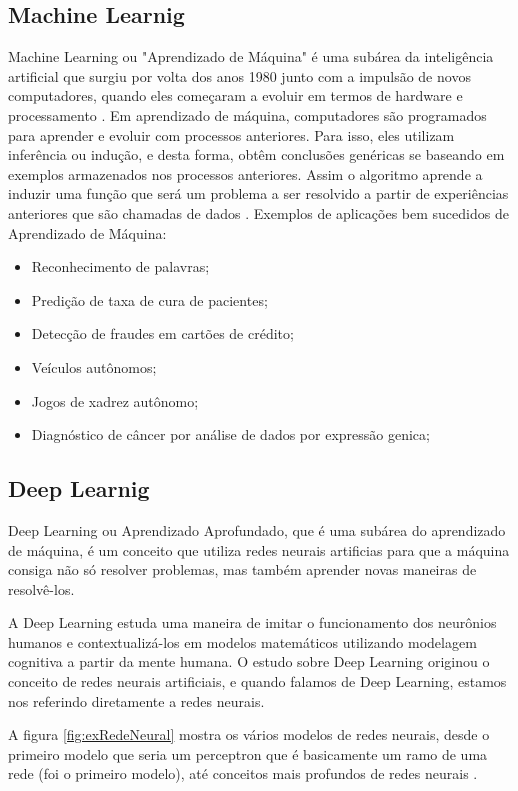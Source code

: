 \subsection{Machine Learnig}
Machine Learning ou "Aprendizado de Máquina" é uma subárea da inteligência artificial que surgiu por volta dos anos 1980 junto com a impulsão de novos computadores, quando eles começaram a evoluir em termos de hardware e processamento \cite{vinteum}. Em aprendizado de máquina, computadores são programados para aprender e evoluir com processos anteriores. Para isso, eles utilizam inferência ou indução, e desta forma, obtêm conclusões genéricas se baseando em exemplos armazenados nos processos anteriores. Assim o algoritmo aprende a induzir uma função que será um problema a ser resolvido a partir de experiências anteriores que são chamadas de dados \cite{vinteum}. Exemplos de aplicações bem sucedidos de Aprendizado de Máquina:
\begin{itemize}
    \item Reconhecimento de palavras;
    \item Predição de taxa de cura de pacientes;
    \item Detecção de fraudes em cartões de crédito;
    \item Veículos autônomos;
    \item Jogos de xadrez autônomo;
    \item Diagnóstico de câncer por análise de dados por expressão genica;
\end{itemize}
\subsection{Deep Learnig}
Deep Learning ou Aprendizado Aprofundado, que é uma subárea do aprendizado de máquina, é um conceito que utiliza redes neurais artificias para que a máquina consiga não só resolver problemas, mas também aprender novas maneiras de resolvê-los. 

A Deep Learning estuda uma maneira de imitar o funcionamento dos neurônios humanos e contextualizá-los em modelos matemáticos utilizando modelagem cognitiva a partir da mente humana. 
O estudo sobre Deep Learning originou o conceito de redes neurais artificiais, e quando falamos de Deep Learning, estamos nos referindo diretamente a redes neurais. 

A figura \ref{fig:exRedeNeural} mostra os vários modelos de redes neurais, desde o primeiro modelo que seria um perceptron que é basicamente um ramo de uma rede (foi o primeiro modelo), até conceitos mais profundos de redes neurais \cite{vintedois}.

